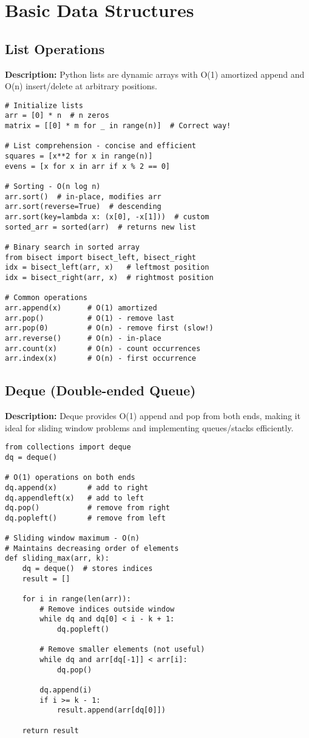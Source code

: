 \section{Basic Data Structures}

\subsection{List Operations}
\textbf{Description:} Python lists are dynamic arrays with O(1) amortized append and O(n) insert/delete at arbitrary positions.

\begin{lstlisting}
# Initialize lists
arr = [0] * n  # n zeros
matrix = [[0] * m for _ in range(n)]  # Correct way!

# List comprehension - concise and efficient
squares = [x**2 for x in range(n)]
evens = [x for x in arr if x % 2 == 0]

# Sorting - O(n log n)
arr.sort()  # in-place, modifies arr
arr.sort(reverse=True)  # descending
arr.sort(key=lambda x: (x[0], -x[1]))  # custom
sorted_arr = sorted(arr)  # returns new list

# Binary search in sorted array
from bisect import bisect_left, bisect_right
idx = bisect_left(arr, x)   # leftmost position
idx = bisect_right(arr, x)  # rightmost position

# Common operations
arr.append(x)      # O(1) amortized
arr.pop()          # O(1) - remove last
arr.pop(0)         # O(n) - remove first (slow!)
arr.reverse()      # O(n) - in-place
arr.count(x)       # O(n) - count occurrences
arr.index(x)       # O(n) - first occurrence
\end{lstlisting}

\subsection{Deque (Double-ended Queue)}
\textbf{Description:} Deque provides O(1) append and pop from both ends, making it ideal for sliding window problems and implementing queues/stacks efficiently.

\begin{lstlisting}
from collections import deque
dq = deque()

# O(1) operations on both ends
dq.append(x)       # add to right
dq.appendleft(x)   # add to left
dq.pop()           # remove from right
dq.popleft()       # remove from left

# Sliding window maximum - O(n)
# Maintains decreasing order of elements
def sliding_max(arr, k):
    dq = deque()  # stores indices
    result = []
    
    for i in range(len(arr)):
        # Remove indices outside window
        while dq and dq[0] < i - k + 1:
            dq.popleft()
        
        # Remove smaller elements (not useful)
        while dq and arr[dq[-1]] < arr[i]:
            dq.pop()
        
        dq.append(i)
        if i >= k - 1:
            result.append(arr[dq[0]])
    
    return result
\end{lstlisting}

